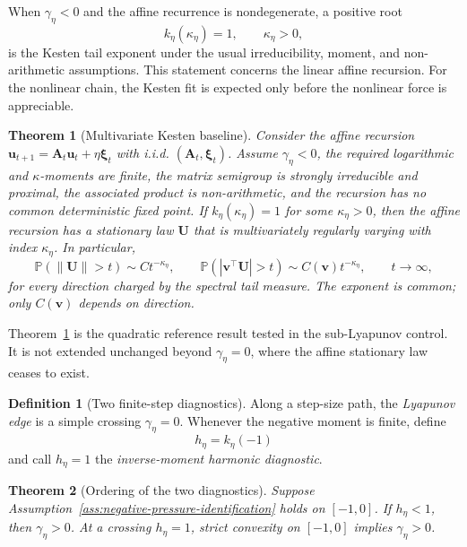 \documentclass[11pt]{article}
\newtheorem{theorem}{Theorem}
\theoremstyle{definition}
\newtheorem{definition}{Definition}
\newcommand{\Pp}{\mathbb P}
\newcommand{\uvec}{\mathbf u}
\newcommand{\vvec}{\mathbf v}
\newcommand{\Avec}{\mathbf A}
\newcommand{\xivec}{\boldsymbol\xi}
\begin{document}
When $\gamma_\eta<0$ and the affine recurrence is nondegenerate, a positive
root
\begin{equation}
  k_\eta(\kappa_\eta)=1,
  \qquad \kappa_\eta>0,
  \label{eq:kesten-root}
\end{equation}
is the Kesten tail exponent under the usual irreducibility, moment, and
non-arithmetic assumptions.  This statement concerns the linear affine
recursion.  For the nonlinear chain, the Kesten fit is expected only before
the nonlinear force is appreciable.

\begin{theorem}[Multivariate Kesten baseline]
\label{thm:kesten-baseline}
Consider the affine recursion
$\uvec_{t+1}=\Avec_t\uvec_t+\eta\xivec_t$ with i.i.d.
$(\Avec_t,\xivec_t)$.  Assume $\gamma_\eta<0$, the required logarithmic and
$\kappa$-moments are finite, the matrix semigroup is strongly irreducible and
proximal, the associated product is non-arithmetic, and the recursion has no
common deterministic fixed point.  If $k_\eta(\kappa_\eta)=1$ for some
$\kappa_\eta>0$, then the affine recursion has a stationary law $\mathbf U$ that is
multivariately regularly varying with index $\kappa_\eta$.  In particular,
\begin{equation}
 \Pp(\|\mathbf U\|>t)\sim C t^{-\kappa_\eta},
 \qquad
 \Pp(|\vvec^\top\mathbf U|>t)\sim C(\vvec)t^{-\kappa_\eta},
 \qquad t\to\infty,
 \label{eq:kesten-directional}
\end{equation}
for every direction charged by the spectral tail measure.  The exponent is
common; only $C(\vvec)$ depends on direction.
\end{theorem}

Theorem~\ref{thm:kesten-baseline} is the quadratic reference result tested in
the sub-Lyapunov control.  It is not extended unchanged beyond
$\gamma_\eta=0$, where the affine stationary law ceases to exist.

\begin{definition}[Two finite-step diagnostics]
Along a step-size path, the \emph{Lyapunov edge} is a simple crossing
$\gamma_\eta=0$.  Whenever the negative moment is finite, define
\begin{equation}
  h_\eta=k_\eta(-1)
  \label{eq:harmonic}
\end{equation}
and call $h_\eta=1$ the \emph{inverse-moment harmonic diagnostic}.
\end{definition}

\begin{theorem}[Ordering of the two diagnostics]
\label{thm:ordering}
Suppose Assumption~\ref{ass:negative-pressure-identification} holds on
$[-1,0]$.
If $h_\eta<1$, then $\gamma_\eta>0$.  At a crossing $h_\eta=1$, strict
convexity on $[-1,0]$ implies $\gamma_\eta>0$.
\end{theorem}
\end{document}
